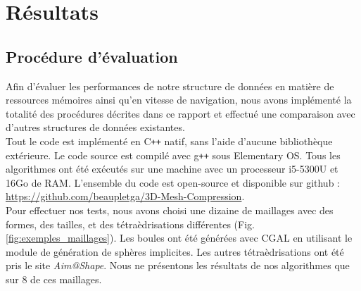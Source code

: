 \section{Résultats}
\subsection{Procédure d'évaluation}
\noindent
Afin d'évaluer les performances de notre structure de données en matière de ressources mémoires ainsi qu'en vitesse de navigation, nous avons implémenté la totalité des procédures décrites dans ce rapport et effectué une comparaison avec d'autres structures de données existantes.\\
Tout le code est implémenté en C\texttt{++} natif, sans l'aide d'aucune bibliothèque extérieure. Le code source est compilé avec g\texttt{++} sous Elementary OS. Tous les algorithmes ont été exécutés sur une machine avec un processeur i5-5300U et 16Go de RAM. L'ensemble du code est open-source et disponible sur github : \url{https://github.com/beaupletga/3D-Mesh-Compression}.\\
Pour effectuer nos tests, nous avons choisi une dizaine de maillages avec des formes, des tailles, et des tétraèdrisations différentes (Fig. \ref{fig:exemples_maillages}). Les boules ont été générées avec CGAL \cite{CGAL} en utilisant le module de génération de sphères implicites. Les autres tétraèdrisations ont été pris le site \textit{Aim@Shape}. Nous ne présentons les résultats de nos algorithmes que sur 8 de ces maillages.
